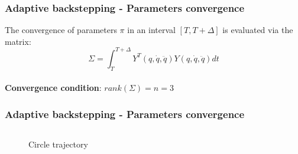 %
\begin{frame}
\frametitle{Adaptive backstepping - Parameters convergence}
The convergence of parameters $\pi$ in an interval $[T, T+\Delta]$ is evaluated via the matrix:
\begin{equation*}
\Sigma = \int_{T}^{T+\Delta}Y^T(q,\dot{q},\ddot{q})Y(q,\dot{q},\ddot{q})dt
\end{equation*}\\[8pt]
\textbf{Convergence condition}: $rank(\Sigma) = n = 3$
\end{frame}
%
\begin{frame}
\frametitle{Adaptive backstepping - Parameters convergence}
	\begin{columns}
	\begin{column}{0.5\textwidth}
	\begin{figure}
	\captionsetup{labelformat=empty}
	\caption{Circle trajectory}
	\end{figure}
	\end{column}
	\begin{column}{0.5\textwidth}
	\begin{figure}

\end{figure}
\end{column}
\end{columns}
\end{frame}
